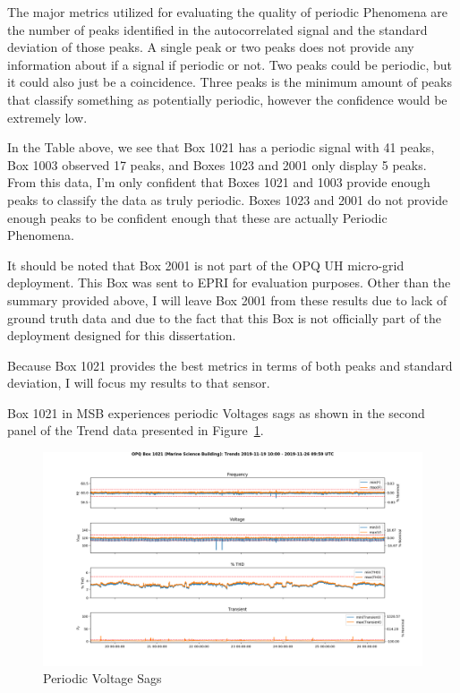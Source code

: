 The major metrics utilized for evaluating the quality of periodic Phenomena are the number of peaks identified in the autocorrelated signal and the standard deviation of those peaks. A single peak or two peaks does not provide any information about if a signal if periodic or not. Two peaks could be periodic, but it could also just be a coincidence. Three peaks is the minimum amount of peaks that classify something as potentially periodic, however the confidence would be extremely low.

In the Table above, we see that Box 1021 has a periodic signal with 41 peaks, Box 1003 observed 17 peaks, and Boxes 1023 and 2001 only display 5 peaks. From this data, I'm only confident that Boxes 1021 and 1003 provide enough peaks to classify the data as truly periodic. Boxes 1023 and 2001 do not provide enough peaks to be confident enough that these are actually Periodic Phenomena.

It should be noted that Box 2001 is not part of the OPQ UH micro-grid deployment. This Box was sent to EPRI for evaluation purposes. Other than the summary provided above, I will leave Box 2001 from these results due to lack of ground truth data and due to the fact that this Box is not officially part of the deployment designed for this dissertation.

Because Box 1021 provides the best metrics in terms of both peaks and standard deviation, I will focus my results to that sensor.

Box 1021 in MSB experiences periodic Voltages sags as shown in the second panel of the Trend data presented in Figure~\ref{fig:v_perio}.

\begin{figure}[H]
    \centering
    \includegraphics[width=\linewidth]{figures/v_perio.png}
    \caption{Periodic Voltage Sags}
    \label{fig:v_perio}
\end{figure}

